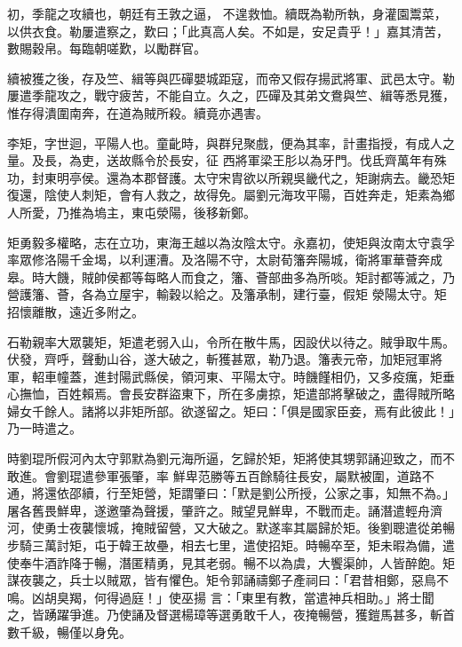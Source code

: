 \begin{pinyinscope}
 初，季龍之攻續也，朝廷有王敦之逼，
 不遑救恤。續既為勒所執，身灌園鬻菜，以供衣食。勒屢遣察之，歎曰；「此真高人矣。不如是，安足貴乎！」嘉其清苦，數賜穀帛。每臨朝嗟歎，以勵群官。



 續被獲之後，存及竺、緝等與匹磾嬰城距寇，而帝又假存揚武將軍、武邑太守。勒屢遣季龍攻之，戰守疲苦，不能自立。久之，匹磾及其弟文鴦與竺、緝等悉見獲，惟存得潰圍南奔，在道為賊所殺。續竟亦遇害。



 李矩，字世迴，平陽人也。童齔時，與群兒聚戲，便為其率，計畫指授，有成人之量。及長，為吏，送故縣令於長安，征
 西將軍梁王肜以為牙門。伐氐齊萬年有殊功，封東明亭侯。還為本郡督護。太守宋胄欲以所親吳畿代之，矩謝病去。畿恐矩復還，陰使人刺矩，會有人救之，故得免。屬劉元海攻平陽，百姓奔走，矩素為鄉人所愛，乃推為塢主，東屯滎陽，後移新鄭。



 矩勇毅多權略，志在立功，東海王越以為汝陰太守。永嘉初，使矩與汝南太守袁孚率眾修洛陽千金堨，以利運漕。及洛陽不守，太尉荀籓奔陽城，衛將軍華薈奔成皋。時大饑，賊帥侯都等每略人而食之，籓、薈部曲多為所啖。矩討都等滅之，乃營護籓、薈，各為立屋宇，輸穀以給之。及籓承制，建行臺，假矩
 滎陽太守。矩招懷離散，遠近多附之。



 石勒親率大眾襲矩，矩遣老弱入山，令所在散牛馬，因設伏以待之。賊爭取牛馬。伏發，齊呼，聲動山谷，遂大破之，斬獲甚眾，勒乃退。籓表元帝，加矩冠軍將軍，軺車幢蓋，進封陽武縣侯，領河東、平陽太守。時饑饉相仍，又多疫癘，矩垂心撫恤，百姓賴焉。會長安群盜東下，所在多虜掠，矩遣部將擊破之，盡得賊所略婦女千餘人。諸將以非矩所部。欲遂留之。矩曰：「俱是國家臣妾，焉有此彼此！」乃一時遣之。



 時劉琨所假河內太守郭默為劉元海所逼，乞歸於矩，矩將使其甥郭誦迎致之，而不敢進。會劉琨遣參軍張肇，率
 鮮卑范勝等五百餘騎往長安，屬默被圍，道路不通，將還依邵續，行至矩營，矩謂肇曰：「默是劉公所授，公家之事，知無不為。」屠各舊畏鮮卑，遂邀肇為聲援，肇許之。賊望見鮮卑，不戰而走。誦潛遣輕舟濟河，使勇士夜襲懷城，掩賊留營，又大破之。默遂率其屬歸於矩。後劉聰遣從弟暢步騎三萬討矩，屯于韓王故壘，相去七里，遣使招矩。時暢卒至，矩未暇為備，遣使奉牛酒詐降于暢，潛匿精勇，見其老弱。暢不以為虞，大饗渠帥，人皆醉飽。矩謀夜襲之，兵士以賊眾，皆有懼色。矩令郭誦禱鄭子產祠曰：「君昔相鄭，惡鳥不鳴。凶胡臭羯，何得過庭！」使巫揚
 言：「東里有教，當遣神兵相助。」將士聞之，皆踴躍爭進。乃使誦及督選楊璋等選勇敢千人，夜掩暢營，獲鎧馬甚多，斬首數千級，暢僅以身免。




\end{pinyinscope}

